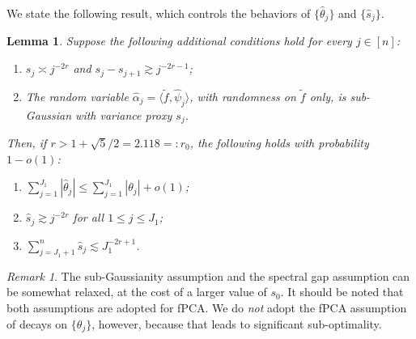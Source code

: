 \documentclass[11pt,a4paper]{article}
\renewcommand{\hat}{\widehat}
\renewcommand{\tilde}{\widetilde}
\theoremstyle{definition}
\theoremstyle{plain}
\newtheorem{lemma}{Lemma}[section]
\theoremstyle{remark}
\newtheorem{remark}{Remark}[section]
\begin{document}
We state the following result, which controls the behaviors of $\{\hat\theta_j\}$ and $\{\hat s_j\}$.
\begin{lemma}
Suppose the following additional conditions hold for every $j\in[n]$:
\begin{enumerate}
\item $s_j\asymp j^{-2r}$ and $s_j-s_{j+1}\gtrsim j^{-2r-1}$;
\item The random variable $\hat\alpha_j = \langle \tilde f,\hat\psi_j\rangle$, with randomness on $\tilde f$ only, is sub-Gaussian with variance proxy $s_j$.
\end{enumerate}
Then, if $r>1+\sqrt{5}/2=2.118=:r_0$, the following holds with probability $1-o(1)$:
\begin{enumerate}
\item $\sum_{j=1}^{J_1}|\hat\theta_j| \leq \sum_{j=1}^{J_1}|\theta_j| + o(1)$;
\item $\hat s_j\gtrsim j^{-2r}$ for all $1\leq j\leq J_1$;
\item $\sum_{j=J_1+1}^n \hat s_j \lesssim J_1^{-2r+1}$.
\end{enumerate}
\label{lem:hat-psi}
\end{lemma}

\begin{remark}
The sub-Gaussianity assumption and the spectral gap assumption can be somewhat relaxed, at the cost of a larger value of $s_0$. It should be noted that both assumptions are adopted for fPCA. We do \emph{not} adopt the fPCA assumption of decays on $\{\theta_j\}$, however, because that leads to significant sub-optimality.
\end{remark}
\end{document}
